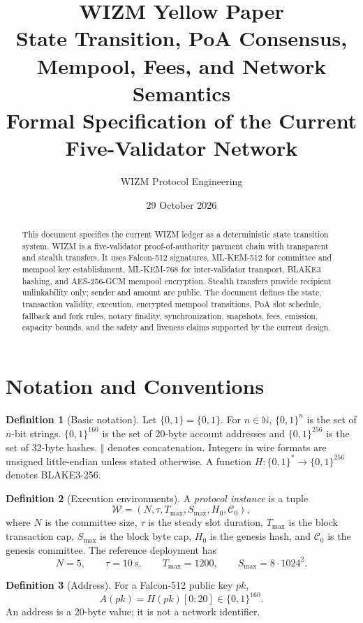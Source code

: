 \documentclass[11pt,a4paper]{article}
\title{\textbf{WIZM Yellow Paper}\\[2mm]
\large State Transition, PoA Consensus, Mempool, Fees, and Network Semantics\\[1mm]
\large Formal Specification of the Current Five-Validator Network}
\author{WIZM Protocol Engineering}
\date{29 October 2026}
\theoremstyle{definition}
\newtheorem{definition}{Definition}[section]
\theoremstyle{plain}
\newcommand{\B}{\{0,1\}}
\newcommand{\Bclx}{\B^{160}}
\newcommand{\Bccxxxii}{\B^{256}}
\newcommand{\concat}{\mathbin{\Vert}}
\newcommand{\N}{\mathbb{N}}
\begin{document}
\maketitle

\begin{abstract}
This document specifies the current WIZM ledger as a deterministic state
transition system. WIZM is a five-validator proof-of-authority payment chain
with transparent and stealth transfers. It uses Falcon-512 signatures,
ML-KEM-512 for committee and mempool key establishment, ML-KEM-768 for
inter-validator transport, BLAKE3 hashing, and AES-256-GCM mempool encryption.
Stealth transfers provide recipient unlinkability only; sender and amount are
public. The document defines the state, transaction validity, execution,
encrypted mempool transitions, PoA slot schedule, fallback and fork rules,
notary finality, synchronization, snapshots, fees, emission, capacity bounds,
and the safety and liveness claims supported by the current design.
\end{abstract}

\tableofcontents

\section{Notation and Conventions}

\begin{definition}[Basic notation]
Let $\B=\{0,1\}$. For $n\in\N$, $\B^n$ is the set of $n$-bit strings.
$\Bclx$ is the set of 20-byte account addresses and $\Bccxxxii$ is the set of
32-byte hashes. $\concat$ denotes concatenation. Integers in wire formats are
unsigned little-endian unless stated otherwise. A function $H:\B^*\to
\Bccxxxii$ denotes BLAKE3-256.
\end{definition}

\begin{definition}[Execution environments]
A \emph{protocol instance} is a tuple
\[
  \mathcal{W} = (N, \tau, T_{\max}, S_{\max}, H_0, \mathcal{C}_0),
\]
where $N$ is the committee size, $\tau$ is the steady slot duration,
$T_{\max}$ is the block transaction cap, $S_{\max}$ is the block byte cap,
$H_0$ is the genesis hash, and $\mathcal{C}_0$ is the genesis committee.
The reference deployment has
\[
  N=5,\qquad \tau=10\ \mathrm{s},\qquad T_{\max}=1200,\qquad
  S_{\max}=8\cdot 1024^2.
\]
\end{definition}

\begin{definition}[Address]
For a Falcon-512 public key $pk$,
\[
  A(pk)=H(pk)[0:20]\in\Bclx.
\]
An address is a 20-byte value; it is not a network identifier.
\end{definition}
\end{document}
